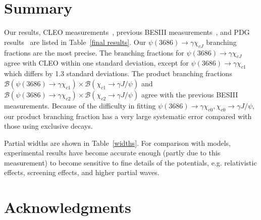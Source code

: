 \documentclass[aps,prd,twocolumn,showpacs,floatfix,byrevtex]{revtex4-1}
\begin{document}
\section{Summary}

Our results, CLEO measurements~\cite{cleo04,mendez,adam05a}, previous
BESIII measurements~\cite{xiaorui,bam158}, and PDG
results~\cite{PDG16} are listed in Table~\ref{final results}.  Our
$\psi(3686) \to \gamma \chi_{cJ}$ branching fractions are the most
precise.  The branching fractions for $\psi(3686) \to \gamma
\chi_{cJ}$ agree with CLEO within one standard deviation, except for
$\psi(3686) \to \gamma \chi_{c1}$ which differs by 1.3 standard
deviations.  The product branching fractions $\mathcal{B}(\psi(3686)
\to \gamma \chi_{c1})\times \mathcal{B}(\chi_{c1} \to \gamma J/\psi)$
and $\mathcal{B}(\psi(3686) \to \gamma \chi_{c2})\times
\mathcal{B}(\chi_{c2} \to \gamma J/\psi)$ agree with the previous
BESIII measurements. Because of the difficulty in fitting $\psi(3686)
\to \gamma \chi_{c0}, \chi_{c0} \to \gamma J/\psi$, our product
branching fraction has a very large systematic error compared with
those using exclusive decays.


Partial widths are shown in Table~\ref{widths}.  For comparison with
models, experimental results have become accurate enough (partly due
to this measurement) to become sensitive to fine details of the
potentials, e.g. relativistic effects, screening effects, and higher
partial waves.





\clearpage
\section{Acknowledgments}
\end{document}
